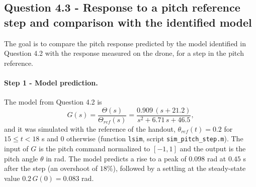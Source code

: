 \subsection*{Question 4.3 - Response to a pitch reference step and comparison with the identified model}

The goal is to compare the pitch response predicted by the model identified in Question 4.2 with the response measured on the drone, for a step in the pitch reference.

\paragraph{Step 1 - Model prediction.}
The model from Question 4.2 is
\begin{equation*}
G(s) = \frac{\Theta(s)}{\Theta_{ref}(s)} = \frac{0.909\,(s + 21.2)}{s^2 + 6.71\, s + 46.5} ,
\end{equation*}
and it was simulated with the reference of the handout, $\theta_{ref}(t) = 0.2$ for $15 \le t < 18$ s and $0$ otherwise (function \texttt{lsim}, script \texttt{sim\_pitch\_step.m}).
The input of $G$ is the pitch command normalized to $[-1, 1]$ and the output is the pitch angle $\theta$ in rad.
The model predicts a rise to a peak of $0.098$ rad at $0.45$ s after the step (an overshoot of $18\%$), followed by a settling at the steady-state value $0.2\,G(0) = 0.083$ rad.

